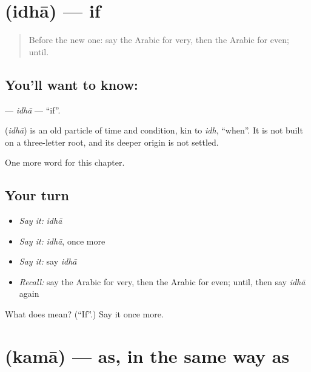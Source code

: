 \section[\texorpdfstring{\ar{إذا} (idhā)}{إذا (idhā)}]{ (idhā) — if}

\label{lesson:AR-C207-idha}



\begin{quote}
Before the new one: say the Arabic for very, then the Arabic for even; until.
\end{quote}

\subsection*{You'll want to know: }
\textbf{} — \emph{idhā} — \textquotedblleft{}if\textquotedblright{}.

\begin{cousinweb}
\textbf{} (\emph{idhā}) is an old particle of time and condition, kin to \emph{idh}, \textquotedblleft{}when\textquotedblright{}. It is not built on a three-letter root, and its deeper origin is not settled.
\end{cousinweb}

\begin{grammarlens}[title={What you've built}]
One more word for this chapter.
\end{grammarlens}

\subsection*{Your turn}
\begin{itemize}
\raggedright
  \item \emph{Say it:} \emph{idhā}
  \item \emph{Say it:} \emph{idhā}, once more
  \item \emph{Say it:} say \emph{idhā}
  \item \emph{Recall:} say the Arabic for very, then the Arabic for even; until, then say \emph{idhā} again
\end{itemize}

\begin{tcolorbox}[breakable,colback=teal!4,colframe=teal!35!black,title={Before you move on}]
What does  mean? (\textquotedblleft{}If\textquotedblright{}.) Say it once more.
\end{tcolorbox}
\section[\texorpdfstring{\ar{كما} (kamā)}{كما (kamā)}]{ (kamā) — as, in the same way as}

